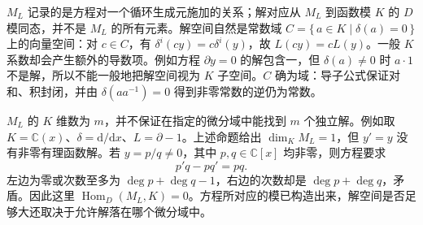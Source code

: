 \(M_L\) 记录的是方程对一个循环生成元施加的关系；解对应从 \(M_L\) 到函数模 \(K\) 的 \(D\) 模同态，并不是 \(M_L\) 的所有元素。解空间自然是常数域 \(C=\bigl\{\,a\in K\mid\delta(a)=0\,\bigr\}\) 上的向量空间：对 \(c\in C\)，有 \(\delta^i(cy)=c\delta^i(y)\)，故 \(L(cy)=cL(y)\)。一般 \(K\) 系数却会产生额外的导数项。例如方程 \(\partial y=0\) 的解包含一，但 \(\delta(a)\ne0\) 时 \(a\cdot1\) 不是解，所以不能一般地把解空间视为 \(K\) 子空间。\(C\) 确为域：导子公式保证对和、积封闭，并由 \(\delta(aa^{-1})=0\) 得到非零常数的逆仍为常数。

\ProseParagraphBreak
\(M_L\) 的 \(K\) 维数为 \(m\)，并不保证在指定的微分域中能找到 \(m\) 个独立解。例如取 \(K=\mathbb C(x)\)、\(\delta=\mathrm{d}/\mathrm{d}x\)、\(L=\partial-1\)。上述命题给出 \(\dim_KM_L=1\)，但 \(y'=y\) 没有非零有理函数解。若 \(y=p/q\ne0\)，其中 \(p,q\in\mathbb C[x]\) 均非零，则方程要求
\[
	p'q-pq'=pq.
\]
左边为零或次数至多为 \(\deg p+\deg q-1\)，右边的次数却是 \(\deg p+\deg q\)，矛盾。因此这里 \(\operatorname{Hom}_D(M_L,K)=0\)。方程所对应的模已构造出来，解空间是否足够大还取决于允许解落在哪个微分域中。

